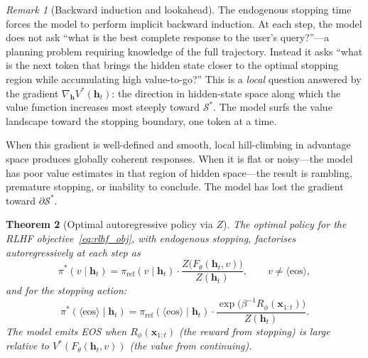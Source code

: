 \documentclass[11pt,a4paper]{article}
\theoremstyle{plain}
\newtheorem{theorem}{Theorem}[section]
\theoremstyle{definition}
\theoremstyle{remark}
\newtheorem{remark}[theorem]{Remark}
\newcommand{\cS}{\mathcal{S}}
\begin{document}
\begin{remark}[Backward induction and lookahead]
The endogenous stopping time forces the model to perform implicit backward
induction. At each step, the model does not ask ``what is the best
complete response to the user's query?''---a planning problem requiring
knowledge of the full trajectory. Instead it asks ``what is the next token
that brings the hidden state closer to the optimal stopping region while
accumulating high value-to-go?'' This is a \emph{local} question answered
by the gradient $\nabla_{\bm{h}} V^*(\bm{h}_t)$: the direction in
hidden-state space along which the value function increases most steeply
toward $\cS^*$. The model surfs the value landscape toward the stopping
boundary, one token at a time.

When this gradient is well-defined and smooth, local hill-climbing in
advantage space produces globally coherent responses. When it is flat or
noisy---the model has poor value estimates in that region of hidden
space---the result is rambling, premature stopping, or inability to
conclude. The model has lost the gradient toward $\partial\cS^*$.
\end{remark}

\begin{theorem}[Optimal autoregressive policy via $Z$]\label{thm:opt_policy_Z}
The optimal policy for the RLHF objective~\eqref{eq:rlhf_obj}, with
endogenous stopping, factorises autoregressively at each step as
\begin{equation}\label{eq:opt_policy_Z}
  \pi^*(v \mid \bm{h}_t)
  = \pi_{\mathrm{ref}}(v \mid \bm{h}_t)
    \cdot \frac{Z\!\bigl(F_\theta(\bm{h}_t, v)\bigr)}{Z(\bm{h}_t)},
    \qquad v \neq \langle\mathrm{eos}\rangle,
\end{equation}
and for the stopping action:
\begin{equation}\label{eq:opt_policy_eos}
  \pi^*(\langle\mathrm{eos}\rangle \mid \bm{h}_t)
  = \pi_{\mathrm{ref}}(\langle\mathrm{eos}\rangle \mid \bm{h}_t)
    \cdot \frac{\exp\!\bigl(\beta^{-1} R_\phi(\bm{x}_{1:t})\bigr)}{Z(\bm{h}_t)}.
\end{equation}
The model emits EOS when $R_\phi(\bm{x}_{1:t})$ (the reward from
stopping) is large relative to $V^*(F_\theta(\bm{h}_t, v))$
(the value from continuing).
\end{theorem}
\end{document}
